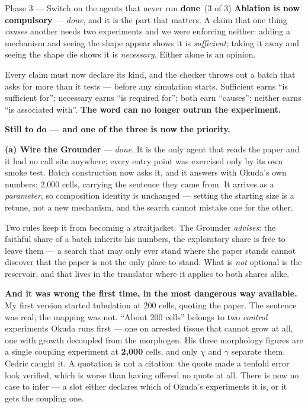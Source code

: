 \documentclass[11pt,a4paper]{article}
\newcommand{\dn}{\textcolor{good}{\textbf{done}}}
\begin{document}
\begin{phasebox}{Phase 3 --- Switch on the agents that never run \hfill \dn\ (3 of 3)}
\textbf{Ablation is now compulsory} --- \emph{done}, and it is the part that matters. A claim that
one thing \emph{causes} another needs two experiments and we were enforcing neither: adding a
mechanism and seeing the shape appear shows it is \emph{sufficient}; taking it away and seeing the
shape die shows it is \emph{necessary}. Either alone is an opinion.

Every claim must now declare its kind, and the checker throws out a batch that asks for more than it
tests --- before any simulation starts. Sufficient earns ``is sufficient for''; necessary earns ``is
required for''; both earn ``causes''; neither earns ``is associated with''. \textbf{The word can no
longer outrun the experiment.}

\textbf{Still to do --- and one of the three is now the priority.}

\textbf{(a) Wire the Grounder} --- \emph{done}. It is the only agent that reads the paper and it
had no call site anywhere; every entry point was exercised only by its own smoke test. Batch
construction now asks it, and it answers with Okuda's own numbers: 2,000 cells,
carrying the sentence they came from. It arrives as
a \emph{parameter}, so composition identity is unchanged --- setting the starting size is a retune,
not a new mechanism, and the search cannot mistake one for the other.

Two rules keep it from becoming a straitjacket. The Grounder \emph{advises}: the faithful share of
a batch inherits his numbers, the exploratory share is free to leave them --- a search that may
only ever stand where the paper stands cannot discover that the paper is not the only place to
stand. What is \emph{not} optional is the reservoir, and that lives in the translator where it
applies to both shares alike.

\textbf{And it was wrong the first time, in the most dangerous way available.} My first version
started tubulation at 200 cells, quoting the paper. The sentence was real; the mapping was not.
``About 200 cells'' belongs to two \emph{control} experiments Okuda runs first --- one on arrested
tissue that cannot grow at all, one with growth decoupled from the morphogen. His three morphology
figures are a single coupling experiment at \textbf{2,000} cells, and only $\chi$ and $\gamma$
separate them. Cedric caught it. A quotation is not a citation: the quote made a tenfold error look
verified, which is worse than having offered no quote at all. There is now no case to infer --- a
slot either declares which of Okuda's experiments it is, or it gets the coupling one.


\end{phasebox}
\end{document}
